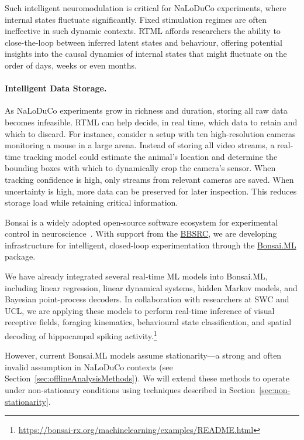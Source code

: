 Such intelligent neuromodulation is critical for NaLoDuCo experiments, where internal states fluctuate significantly. Fixed stimulation regimes are often ineffective in such dynamic contexts. RTML affords researchers the ability to close-the-loop between inferred latent states and behaviour, offering potential insights into the causal dynamics of internal states that might fluctuate on the order of days, weeks or even months. 

\paragraph{Intelligent Data Storage.}
As NaLoDuCo experiments grow in richness and duration, storing all raw data becomes infeasible. RTML can help decide, in real time, which data to retain and which to discard. For instance, consider a setup with ten high-resolution cameras monitoring a mouse in a large arena. Instead of storing all video streams, a real-time tracking model could estimate the animal's location and determine the bounding boxes with which to dynamically crop the camera's sensor. When tracking confidence is high, only streams from relevant cameras are saved. When uncertainty is high, more data can be preserved for later inspection. This reduces storage load while retaining critical information.

\label{sec:bonsai}

Bonsai is a widely adopted open-source software ecosystem for experimental control in neuroscience~\citep{lopesEtAl15}. With support from the \href{https://gow.bbsrc.ukri.org/grants/AwardDetails.aspx?FundingReference=BB\%2FW019132\%2F1}{BBSRC}, we are developing infrastructure for intelligent, closed-loop experimentation through the \href{https://bonsai-rx.org/machinelearning/}{Bonsai.ML} package.

We have already integrated several real-time ML models into Bonsai.ML, including linear regression, linear dynamical systems, hidden Markov models, and Bayesian point-process decoders. In collaboration with researchers at SWC and UCL, we are applying these models to perform real-time inference of visual receptive fields, foraging kinematics, behavioural state classification, and spatial decoding of hippocampal spiking activity.\footnote{\url{https://bonsai-rx.org/machinelearning/examples/README.html}}

However, current Bonsai.ML models assume stationarity—a strong and often invalid assumption in NaLoDuCo contexts (see Section~\ref{sec:offlineAnalysisMethods}). We will extend these methods to operate under non-stationary conditions using techniques described in Section~\ref{sec:non-stationarity}.

